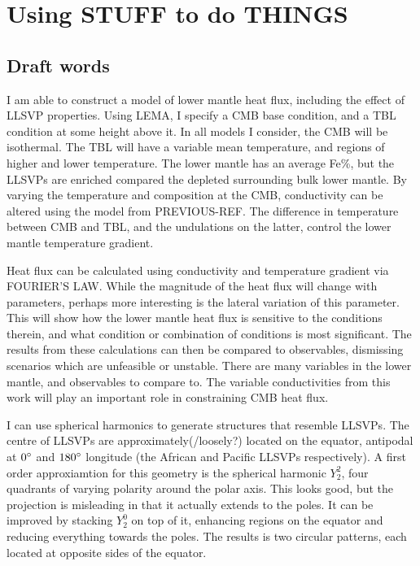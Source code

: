 
\chapter{Using STUFF to do THINGS} %

\label{Chapter5} %

\section{Draft words}

I am able to construct a model of lower mantle heat flux, including the effect of LLSVP properties. Using LEMA, I specify a CMB base condition, and a TBL condition at some height above it. In all models I consider, the CMB will be isothermal. The TBL will have a variable mean temperature, and regions of higher and lower temperature. The lower mantle has an average Fe\%, but the LLSVPs are enriched compared the depleted surrounding bulk lower mantle. By varying the temperature and composition at the CMB, conductivity can be altered using the model from PREVIOUS-REF. The difference in temperature between CMB and TBL, and the undulations on the latter, control the lower mantle temperature gradient. 

Heat flux can be calculated using conductivity and temperature gradient via FOURIER'S LAW. While the magnitude of the heat flux will change with parameters, perhaps more interesting is the lateral variation of this parameter. This will show how the lower mantle heat flux is sensitive to the conditions therein, and what condition or combination of conditions is most significant. The results from these calculations can then be compared to observables, dismissing scenarios which are unfeasible or unstable. There are many variables in the lower mantle, and observables to compare to. The variable conductivities from this work will play an important role in constraining CMB heat flux.

I can use spherical harmonics to generate structures that resemble LLSVPs. The centre of LLSVPs are approximately(/loosely?) located on the equator, antipodal at $0^{\circ}$ and $180^{\circ}$ longitude (the African and Pacific LLSVPs respectively). A first order approxiamtion for this geometry is the spherical harmonic $Y^{2}_{2}$, four quadrants of varying polarity around the polar axis. This looks good, but the projection is misleading in that it actually extends to the poles. It can be improved by stacking $Y^{0}_{2}$ on top of it, enhancing regions on the equator and reducing everything towards the poles. The results is two circular patterns, each located at opposite sides of the equator.

